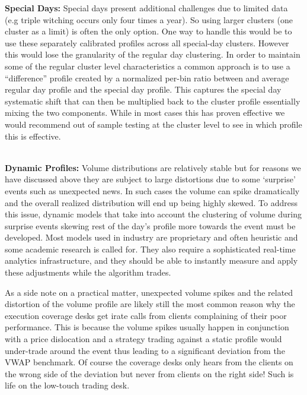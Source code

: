 

\noindent\textbf{Special Days:} Special days present additional challenges due to limited data (e.g triple witching occurs only four times a year). So using larger clusters (one cluster as a limit) is often the only option. One way to handle this would be to use these separately calibrated profiles across all special-day clusters. However this would lose the granularity of the regular day clustering. In order to maintain some of the  regular cluster level characteristics a common approach is to use a ``difference'' profile created by a normalized per-bin ratio between and average regular day profile and the special day profile. This captures the special day systematic shift that can then be multiplied back to the cluster profile essentially mixing the two components. While in most cases this has proven effective we would recommend out of sample testing at the cluster level to see in which profile this is effective. 

\\


\noindent\textbf{Dynamic Profiles:} Volume distributions are relatively stable but for reasons we have discussed above they are subject to large distortions due to some `surprise' events such as unexpected news. In such cases the volume can spike dramatically and the overall realized distribution will end up being highly skewed. To address this issue, dynamic models that take into account the clustering of volume during surprise events skewing rest of the day's profile more towards the event must be developed. Most models used in industry are proprietary and often heuristic and some academic research is called for. They also require a sophisticated real-time analytics infrastructure, and they should be able to instantly measure and apply these adjustments while the algorithm trades.

As a side note on a practical matter, unexpected volume spikes and the related distortion of the volume profile are likely still the most common reason why the execution coverage desks get irate calls from clients complaining of their poor performance. This is because the volume spikes usually happen in conjunction with a price dislocation and a strategy trading against a static profile would under-trade around the event thus leading to a significant deviation from the VWAP benchmark. Of course the coverage desks only hears from the clients on the wrong side of the deviation but never from clients on the right side! Such is life on the low-touch trading desk. 



